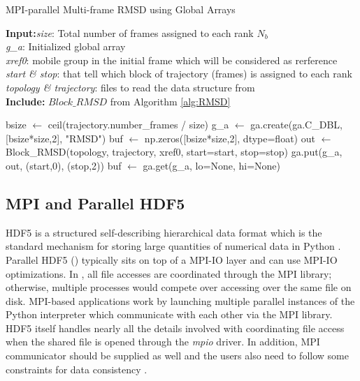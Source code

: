 \begin{algorithm}[ht!]
	\scriptsize
	\caption{MPI-parallel Multi-frame RMSD using Global Arrays}
	\label{alg:GA}
	\hspace*{\algorithmicindent} \textbf{Input:}\emph{size}: Total number of frames assigned to each rank $N_{b}$\\
	\hspace*{\algorithmicindent} \emph{g\_a}: Initialized global array \\
	\hspace*{\algorithmicindent} \emph{xref0}: mobile group in the initial frame which will be considered as rerference \\
	\hspace*{\algorithmicindent} \emph{start \& stop}: that tell which block of trajectory (frames) is assigned to each rank \\
	\hspace*{\algorithmicindent} \emph{topology \& trajectory}: files to read the data structure from \\
	\hspace*{\algorithmicindent}\textbf{Include:} $Block\_RMSD$ from Algorithm \ref{alg:RMSD}
	\begin{algorithmic}[1]
		
		\State bsize $\leftarrow$ ceil(trajectory.number\_frames / size)
		\State g\_a $\leftarrow$ ga.create(ga.C\_DBL, [bsize*size,2], "RMSD")
		\State buf $\leftarrow$ np.zeros([bsize*size,2], dtype=float)
		\State out $\leftarrow$ Block\_RMSD(topology, trajectory, xref0, start=start, stop=stop)
		\State ga.put(g\_a, out, (start,0), (stop,2))
		\State buf $\leftarrow$ ga.get(g\_a, lo=None, hi=None)
		\EndIf
	\end{algorithmic}
\end{algorithm}

\subsection{MPI and Parallel HDF5}
HDF5 is a structured self-describing hierarchical data format which is the standard mechanism for storing large quantities of numerical data in Python \cite{pythonhdf5, HDF5_url}.
Parallel HDF5 () typically sits on top of a MPI-IO layer and can use MPI-IO optimizations. 
In , all file accesses are coordinated through the MPI library; otherwise, multiple processes would compete over accessing over the same file on disk. 
MPI-based applications work by launching multiple parallel instances of the Python interpreter which communicate with each other via the MPI library. 
HDF5 itself handles nearly all the details involved with coordinating file access when the shared file is opened through the \emph{mpio} driver.
In addition, MPI communicator should be supplied as well and the users also need to follow some constraints for data consistency \cite{pythonhdf5}.

